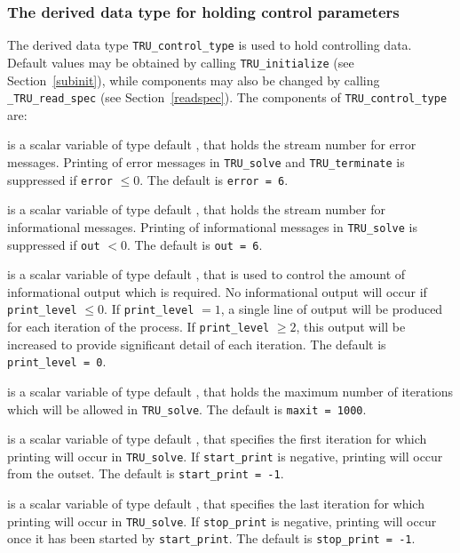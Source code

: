 \documentclass{galahad}
\newcommand{\packagename}{TRU}
\newcommand{\fullpackagename}{\libraryname\_\packagename}
\begin{document}
\subsubsection{The derived data type for holding control
 parameters}\label{typecontrol}
The derived data type
{\tt \packagename\_control\_type}
is used to hold controlling data. Default values may be obtained by calling
{\tt \packagename\_initialize}
(see Section~\ref{subinit}),
while components may also be changed by calling
{\tt \fullpackagename\_read\-\_spec}
(see Section~\ref{readspec}).
The components of
{\tt \packagename\_control\_type}
are:


\begin{description}

 is a scalar variable of type default \integer, that holds the
stream number for error messages. Printing of error messages in
{\tt \packagename\_solve} and {\tt \packagename\_terminate}
is suppressed if {\tt error} $\leq 0$.
The default is {\tt error = 6}.

 is a scalar variable of type default \integer, that holds the
stream number for informational messages. Printing of informational messages in
{\tt \packagename\_solve} is suppressed if {\tt out} $< 0$.
The default is {\tt out = 6}.

 is a scalar variable of type default \integer, that is used
to control the amount of informational output which is required. No
informational output will occur if {\tt print\_level} $\leq 0$. If
{\tt print\_level} $= 1$, a single line of output will be produced for each
iteration of the process. If {\tt print\_level} $\geq 2$, this output will be
increased to provide significant detail of each iteration.
The default is {\tt print\_level = 0}.

 is a scalar variable of type default \integer, that holds the
maximum number of iterations which will be allowed in {\tt \packagename\_solve}.
The default is {\tt maxit = 1000}.

 is a scalar variable of type default \integer, that specifies
the first iteration for which printing will occur in {\tt \packagename\_solve}.
If {\tt start\_print} is negative, printing will occur from the outset.
The default is {\tt start\_print = -1}.

 is a scalar variable of type default \integer, that specifies
the last iteration for which printing will occur in  {\tt \packagename\_solve}.
If {\tt stop\_print} is negative, printing will occur once it has been
started by {\tt start\_print}.
The default is {\tt stop\_print = -1}.


\end{description}
\end{document}
